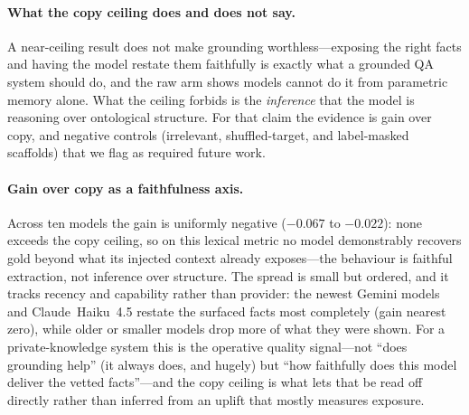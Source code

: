 \documentclass[11pt]{article}
\begin{document}
\paragraph{What the copy ceiling does and does not say.}
A near-ceiling result does not make grounding worthless---exposing the right facts and having the
model restate them faithfully is exactly what a grounded QA system should do, and the raw arm
shows models cannot do it from parametric memory alone. What the ceiling forbids is the
\emph{inference} that the model is reasoning over ontological structure. For that claim the
evidence is gain over copy, and negative controls (irrelevant, shuffled-target, and label-masked
scaffolds) that we flag as required future work.

\paragraph{Gain over copy as a faithfulness axis.}
Across ten models the gain is uniformly negative ($-0.067$ to $-0.022$): none exceeds the copy
ceiling, so on this lexical metric no model demonstrably recovers gold beyond what its injected
context already exposes---the behaviour is faithful extraction, not inference over structure. The
spread is small but ordered, and it tracks recency and capability rather than provider: the newest
Gemini models and Claude~Haiku~4.5 restate the surfaced facts most completely (gain nearest zero),
while older or smaller models drop more of what they were shown. For a private-knowledge system
this is the operative quality signal---not ``does grounding help'' (it always does, and hugely)
but ``how faithfully does this model deliver the vetted facts''---and the copy ceiling is what lets
that be read off directly rather than inferred from an uplift that mostly measures exposure.

\end{document}
